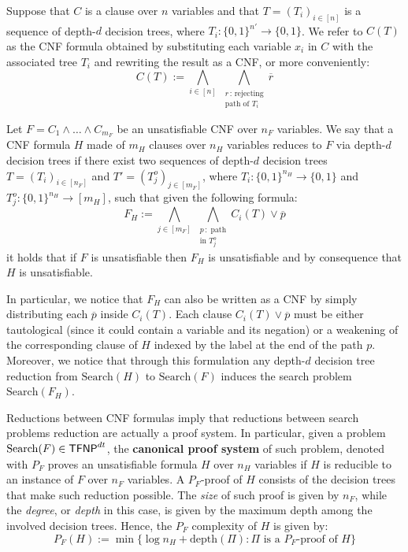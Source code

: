 Suppose that $C$ is a clause over $n$ variables and that $T = (T_i)_{i \in [n]}$ is a sequence of depth-$d$ decision trees, where $T_i : \{0,1\}^{n'} \to \{0,1\}$. We refer to $C(T)$ as the CNF formula obtained by substituting each variable $x_i$ in $C$ with the associated tree $T_i$ and rewriting the result as a CNF, or more conveniently:
\[C(T) := \bigwedge_{i \in [n]} \, \bigwedge_{\substack{r \,:\, \text{rejecting} \\ \text{path of $T_i$}}} \overline{r}\]

\begin{definition}
    Let $F = C_1 \land \ldots \land C_{m_F}$ be an unsatisfiable CNF over $n_F$ variables. We say that a CNF formula $H$ made of $m_H$ clauses over $n_H$ variables reduces to $F$ via depth-$d$ decision trees if there exist two sequences of depth-$d$ decision trees $T = (T_i)_{i \in [n_F]}$ and $T' = (T_j^o)_{j \in [m_F]}$, where $T_i : \{0,1\}^{n_H} \to \{0,1\}$ and $T_j^o : \{0,1\}^{n_H} \to [m_H]$, such that given the following formula:
    \[F_H := \bigwedge_{j \in [m_F]} \,\bigwedge_{\substack{p \,:\; \text{path} \\ \text{in } T_j^o}} C_i(T) \lor \overline{p}\]
    it holds that if $F$ is unsatisfiable then $F_H$ is unsatisfiable and by consequence that $H$ is unsatisfiable. 
\end{definition}

In particular, we notice that $F_H$ can also be written as a CNF by simply distributing each $\overline{p}$ inside $C_i(T)$. Each clause $C_i(T) \lor \overline{p}$ must be either tautological (since it could contain a variable and its negation) or a weakening of the corresponding clause of $H$ indexed by the label at the end of the path $p$. Moreover, we notice that through this formulation any depth-$d$ decision tree reduction from $\mathrm{Search}(H)$ to $\mathrm{Search}(F)$ induces the search problem $\mathrm{Search}(F_H)$.

Reductions between CNF formulas imply that reductions between search problems reduction are actually a proof system. In particular, given a problem $\mathrm{Search}(F) \in \mathsf{TFNP}^{dt}$, the \textbf{canonical proof system} of such problem, denoted with $P_F$ proves an unsatisfiable formula $H$ over $n_H$ variables if $H$ is reducible to an instance of $F$ over $n_F$ variables. A $P_F$-proof of $H$ consists of the decision trees that make such reduction possible. The \textit{size} of such proof is given by $n_F$, while the \textit{degree}, or \textit{depth} in this case, is given by the maximum depth among the involved decision trees. Hence, the $P_F$ complexity of $H$ is given by:
\[P_F(H) := \min\{\log n_H + \mathrm{depth}(\Pi) : \Pi \text{ is a $P_F$-proof of } H\}\]


